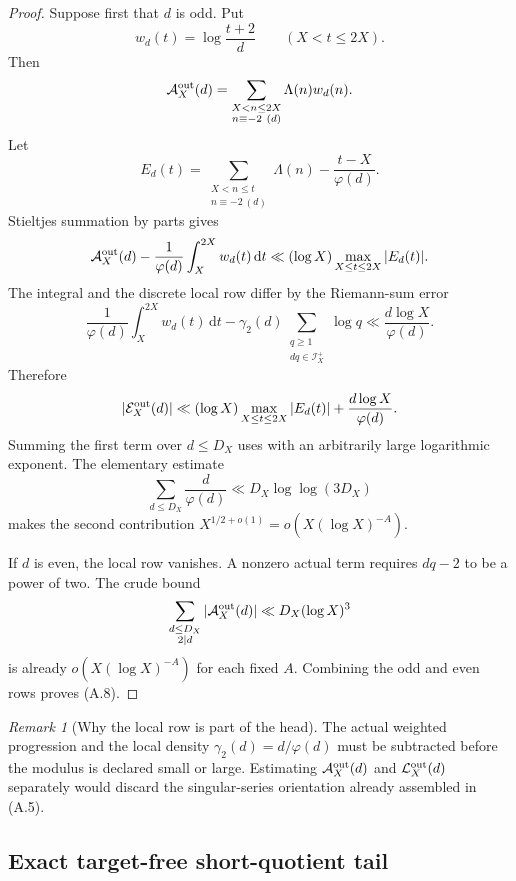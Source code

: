 \documentclass[11pt]{article}
\theoremstyle{definition}
\theoremstyle{remark}
\newtheorem{remark}[theorem]{Remark}
\newcommand{\dd}{\mathrm d}
\begin{document}
\begin{proof}
Suppose first that $d$ is odd.  Put
\[
 w_d(t)=\log\frac{t+2}{d}
 \qquad(X<t\le2X).
\]
Then
\[
 \mathcal A_X^{\rm out}(d)
 =\sum_{\substack{X<n\le2X\\n\equiv-2\ (d)}}
   \Lambda(n)w_d(n).
\]
Let
\[
 E_d(t)
 =\sum_{\substack{X<n\le t\\n\equiv-2\ (d)}}\Lambda(n)
  -\frac{t-X}{\varphi(d)}.
\]
Stieltjes summation by parts gives
\[
 \mathcal A_X^{\rm out}(d)
 -\frac1{\varphi(d)}\int_X^{2X}w_d(t)\,\dd t
 \ll
 (\log X)\max_{X\le t\le2X}|E_d(t)|.
\]
The integral and the discrete local row differ by the Riemann-sum error
\[
 \frac1{\varphi(d)}\int_X^{2X}w_d(t)\,\dd t
 -\gamma_2(d)
  \sum_{\substack{q\ge1\\dq\in\mathscr I_X^+}}\log q
 \ll\frac{d\log X}{\varphi(d)}.
\]
Therefore
\[
 |\mathcal E_X^{\rm out}(d)|
 \ll
 (\log X)\max_{X\le t\le2X}|E_d(t)|
 +\frac{d\log X}{\varphi(d)}.
\]
Summing the first term over $d\le D_X$ uses  with an arbitrarily large
logarithmic exponent.  The elementary estimate
\[
 \sum_{d\le D_X}\frac{d}{\varphi(d)}\ll D_X\log\log(3D_X)
\]
makes the second contribution $X^{1/2+o(1)}=o(X(\log X)^{-A})$.

If $d$ is even, the local row vanishes.  A nonzero actual term requires
$dq-2$ to be a power of two.  The crude bound
\[
 \sum_{\substack{d\le D_X\\2\mid d}}
 |\mathcal A_X^{\rm out}(d)|
 \ll D_X(\log X)^3
\]
is already $o(X(\log X)^{-A})$ for each fixed $A$.  Combining the odd and
even rows proves \textup{(A.8)}.
\end{proof}

\begin{remark}[Why the local row is part of the head]
The actual weighted progression and the local density
$\gamma_2(d)=d/\varphi(d)$ must be subtracted before the modulus is declared
small or large.  Estimating
$\mathcal A_X^{\rm out}(d)$ and
$\mathcal L_X^{\rm out}(d)$ separately would discard the singular-series
orientation already assembled in \textup{(A.5)}.
\end{remark}

\subsection{Exact target-free short-quotient tail}
\label{subsec:affouter-tail}
\end{document}

